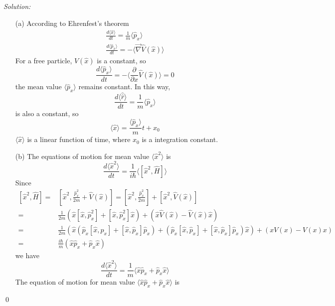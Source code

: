 \documentclass[12pt,a4paper]{article}
\newenvironment{sol}
    {\emph{Solution:}
    }
    {
    \qed
    }
\begin{document}
\begin{sol}
\begin{itemize}
\item[(a)] According to Ehrenfest's theorem
\begin{gather}
\frac{d\langle\hat{x}\rangle}{dt}=\frac{1}{m}\langle\hat{p}_x\rangle\\
\frac{d\langle\hat{p}_x\rangle}{dt}=-\langle\vec{\nabla}\hat{V}(\hat{x})\rangle
\end{gather}
For a free particle, $V(\hat{x})$ is a constant, so
\begin{equation}
\frac{d\langle\hat{p}_x\rangle}{dt}=-\langle\frac{\partial}{\partial x}\hat{V}(\hat{x})\rangle=0
\end{equation}
the mean value $\langle\hat{p}_x\rangle$ remains constant. In this way,
\begin{equation}
\frac{d\langle\hat{\hat{r}}\rangle}{dt}=\frac{1}{m}\langle\hat{p}_x\rangle
\end{equation}
is also a constant, so
\begin{equation}
\langle\hat{x}\rangle=\frac{\langle\hat{p}_x\rangle}{m}t+x_0
\end{equation}
$\langle\hat{x}\rangle$ is a linear function of time, where $x_0$ is a integration constant.
\item[(b)] The equations of motion for mean value $\langle\hat{x}^2\rangle$ is
\begin{equation}
\frac{d\langle\hat{x}^2\rangle}{dt}=\frac{1}{i\hbar}\langle[\hat{x}^2,\hat{H}]\rangle
\end{equation}
Since
\begin{align}
\nonumber[\hat{x}^2,\hat{H}]=&[\hat{x}^2,\frac{\hat{p}_x^2}{2m}+\hat{V}(\hat{x})]=[\hat{x}^2,\frac{\hat{p}_x^2}{2m}]+[\hat{x}^2,\hat{V}(\hat{x})]\\
\nonumber=&\frac{1}{2m}\left(\hat{x}[\hat{x},\hat{p}_x^2]+[\hat{x},\hat{p}_x^2]\hat{x}\right)+(\hat{x}\hat{V}(\hat{x})-\hat{V}(\hat{x})\hat{x})\\
\nonumber=&\frac{1}{2m}\left(\hat{x}(\hat{p}_x[\hat{x},\hat{p}_x]+[\hat{x},\hat{p}_x]\hat{p}_x)+(\hat{p}_x[\hat{x},\hat{p}_x]+[\hat{x},\hat{p}_x]\hat{p}_x)\hat{x}\right)+(xV(x)-V(x)x)\\
=&\frac{i\hbar}{m}(\hat{x}\hat{p}_x+\hat{p}_x\hat{x})
\end{align}
we have
\begin{equation}
\frac{d\langle\hat{x}^2\rangle}{dt}=\frac{1}{m}\langle\hat{x}\hat{p}_x+\hat{p}_x\hat{x}\rangle
\end{equation}
The equation of motion for mean value $\langle\hat{x}\hat{p}_x+\hat{p}_x\hat{x}\rangle$ is

\end{itemize}
\end{sol}
\end{document}
